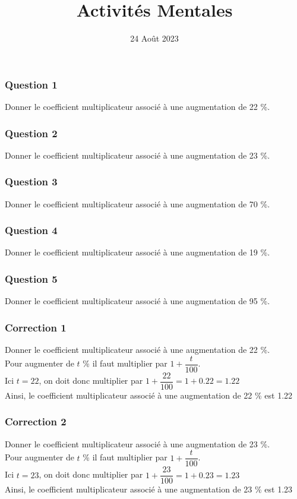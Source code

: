 \documentclass[15pt, mathserif]{beamer}
\title{Activités Mentales}
\date{24 Août 2023}
\begin{document}
\begin{frame}
    \titlepage
\end{frame}

\begin{frame} 
	\frametitle{Question 1}
Donner le coefficient multiplicateur associé à une augmentation de 22 \%.\end{frame}


\begin{frame} 
	\frametitle{Question 2}
Donner le coefficient multiplicateur associé à une augmentation de 23 \%.\end{frame}


\begin{frame} 
	\frametitle{Question 3}
Donner le coefficient multiplicateur associé à une augmentation de 70 \%.\end{frame}


\begin{frame} 
	\frametitle{Question 4}
Donner le coefficient multiplicateur associé à une augmentation de 19 \%.\end{frame}


\begin{frame} 
	\frametitle{Question 5}
Donner le coefficient multiplicateur associé à une augmentation de 95 \%.\end{frame}


\begin{frame}
\vspace{-10mm}
	\frametitle{Correction 1}
Donner le coefficient multiplicateur associé à une augmentation de 22 \%. \\ \bigskip 
 Pour augmenter de $t$ \%  il faut multiplier par $1+\dfrac{t}{100}$. \\ \bigskip Ici $t=22$, on doit donc multiplier par  $1+\dfrac{22}{100}=1+0.22=1.22$ \\ \bigskip Ainsi, le coefficient multiplicateur associé à une augmentation de 22 \% est 1.22\end{frame}


\begin{frame}
\vspace{-10mm}
	\frametitle{Correction 2}
Donner le coefficient multiplicateur associé à une augmentation de 23 \%. \\ \bigskip 
 Pour augmenter de $t$ \%  il faut multiplier par $1+\dfrac{t}{100}$. \\ \bigskip Ici $t=23$, on doit donc multiplier par  $1+\dfrac{23}{100}=1+0.23=1.23$ \\ \bigskip Ainsi, le coefficient multiplicateur associé à une augmentation de 23 \% est 1.23\end{frame}
\end{document}
